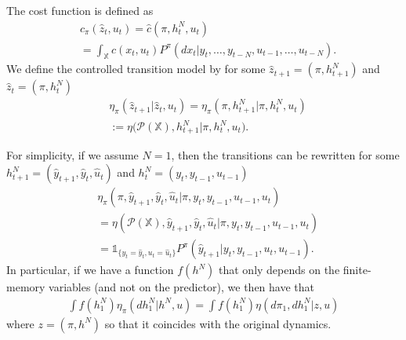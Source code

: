 \documentclass[letterpaper, 10 pt, conference]{ieeeconf}  %
\def\P{{\mathcal P}}
\theoremstyle{definition}
\theoremstyle{remark}
\begin{document}
The cost function is defined as 
\begin{align}\label{cost_window}
&\hat{c}_\pi(\hat{z}_t,u_t)=\hat{c}(\pi,h_t^N,u_t)\\
&=\int_\mathds{X}c(x_t,u_t)P^{\pi}(dx_t|y_t,\dots,y_{t-N},u_{t-1},\dots,u_{t-N}).\nonumber
\end{align}
We define the controlled transition model by for some $\hat{z}_{t+1}=(\pi,h_{t+1}^N)$ and $\hat{z}_{t}=(\pi,h_{t}^N)$
\begin{align}\label{eta_N}
&{\eta}_\pi(\hat{z}_{t+1}|\hat{z}_t,u_t)={\eta}_\pi(\pi,h_{t+1}^N|\pi,h_t^N,u_t)\nonumber\\
&:={\eta}\bigg(\P(\mathds{X}),h_{t+1}^N|\pi,h_t^N,u_t\bigg).
\end{align}

For simplicity, if we assume $N=1$, then the transitions can be rewritten for some $h_{t+1}^N=(\hat{y}_{t+1},\hat{y}_t,\hat{u}_t)$ and $h_t^N=(y_t,y_{t-1},u_{t-1})$
\begin{align}\label{alt_eta_N}
&{\eta}_\pi(\pi,\hat{y}_{t+1},\hat{y}_t,\hat{u}_t|\pi,y_t,y_{t-1},u_{t-1},u_t)\nonumber\\
&={\eta}(\P(\mathds{X}),\hat{y}_{t+1},\hat{y}_t,\hat{u}_t|\pi,y_t,y_{t-1},u_{t-1},u_t)\nonumber\\
&=\mathds{1}_{\{y_t=\hat{y}_t,u_t=\hat{u}_t\}}P^{\pi}(\hat{y}_{t+1}|y_t,y_{t-1},u_t,u_{t-1}).
\end{align} 
In particular, if we have a function $f(h^N)$ that only depends on the finite-memory variables (and not on the predictor), we then have that
\begin{align}\label{consistent}
\int f(h^N_1)\eta_\pi(dh_1^N|h^N,u) = \int f(h_1^N)\eta(d\pi_1,dh_1^N|z,u)
\end{align}
where $z=(\pi,h^N)$ so that it coincides with the original dynamics.



\end{document}
